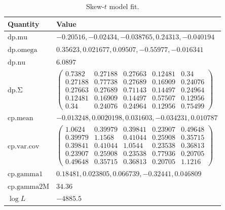 \begin{table}[ht]
\centering
\begin{tabular}{ll}
\toprule
Quantity & Value \\
\midrule
$\mathrm{dp.mu}$ & $-0.20516, -0.02434, -0.038765, 0.24313, -0.040194$ \\
$\mathrm{dp.omega}$ & $0.35623, 0.021677, 0.09507, -0.55977, -0.016341$ \\
$\mathrm{dp.nu}$ & $6.0897$ \\
$\mathrm{dp.\Sigma}$ & $\begin{pmatrix}0.7382 & 0.27188 & 0.27663 & 0.12481 & 0.34\\0.27188 & 0.77738 & 0.27689 & 0.16909 & 0.24076\\0.27663 & 0.27689 & 0.71143 & 0.14497 & 0.24964\\0.12481 & 0.16909 & 0.14497 & 0.57507 & 0.12956\\0.34 & 0.24076 & 0.24964 & 0.12956 & 0.75499\end{pmatrix}$ \\
$\mathrm{cp.mean}$ & $-0.013248, 0.0020198, 0.031603, -0.034231, 0.010787$ \\
$\mathrm{cp.var.cov}$ & $\begin{pmatrix}1.0624 & 0.39979 & 0.39841 & 0.23907 & 0.49648\\0.39979 & 1.1568 & 0.41044 & 0.25908 & 0.35715\\0.39841 & 0.41044 & 1.0544 & 0.23538 & 0.36813\\0.23907 & 0.25908 & 0.23538 & 0.77936 & 0.20705\\0.49648 & 0.35715 & 0.36813 & 0.20705 & 1.1216\end{pmatrix}$ \\
$\mathrm{cp.gamma1}$ & $0.18481, 0.023805, 0.066739, -0.32441, 0.046809$ \\
$\mathrm{cp.gamma2M}$ & $34.36$ \\
$\log L$ & $-4885.5$ \\
\bottomrule
\end{tabular}
\caption{Skew-$t$ model fit.}
\end{table}